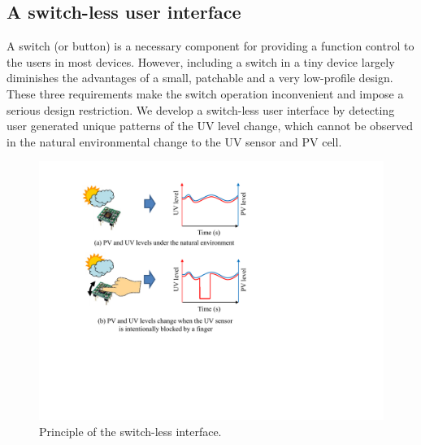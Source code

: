 \documentclass[journal]{IEEEtran}
\begin{document}
%

\subsection{A switch-less user interface}
A switch (or button) is a necessary component for providing a function control to the users in most devices. However, including a switch in a tiny device largely diminishes the advantages of a small, patchable and a very low-profile design. These three requirements make the switch operation inconvenient and impose a serious design restriction. We develop a switch-less user interface by detecting user generated unique patterns of the UV level change, which cannot be observed in the natural environmental change to the UV sensor and PV cell.

\begin{figure}
\centering
\includegraphics[width=0.8\hsize]{Figures/switchless_interface.pdf}
\caption{Principle of the switch-less interface.}
\label{fig:switchless_interface}
\end{figure}
\end{document}
